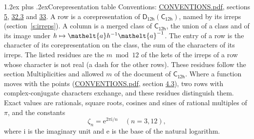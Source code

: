 \documentclass[10pt,a4paper]{article}
\makeatletter
\renewcommand\section{\@startsection{section}{1}{\z@}{-3ex plus -1ex minus -.2ex}%
  {1.2ex plus .2ex}{\normalfont\large\sffamily\bfseries\color{parttitle}}}
\numberwithin{equation}{section}
\newcommand{\eltfont}[1]{{\let\sigma\eltsigma\mathelt{#1}}}
\newcommand{\grp}[1]{\mathsf{#1}}
\newcommand{\elt}[1]{\eltfont{#1}}
\newcommand{\iunit}{\mathrm{i}}
\newcommand{\expe}{\mathrm{e}}
\newcommand{\rootunity}[1]{\zeta_{#1}}
\makeatother
\begin{document}
\section{Corepresentation table}\label{s:character_table}
Conventions: \href{../../CONVENTIONS.pdf}{CONVENTIONS.pdf}, sections \href{../../../rotation/CONVENTIONS.pdf\#conv.5}{5}, \href{../../CONVENTIONS.pdf\#conv.32.3}{32.3} and \href{../../CONVENTIONS.pdf\#conv.33}{33}.
A row is a corepresentation of $\grp{D_{12h}}(\grp{C_{12h}})$, named by its irreps (section~\ref{s:irreps}). A column is a merged class of $\grp{C_{12h}}$, the union of a class and of its image under $h \mapsto \elt{a} h^{-1} \elt{a}^{-1}$. The entry of a row is the character of its corepresentation on the class, the sum of the characters of its irreps.
\leavevmode\label{n:head.parity}The listed residues are the $m \bmod 12$ of the kets of the irreps of a row whose character is not real (a dash for the other rows). These residues follow the section Multiplicities and allowed $m$ of the document of \href{../../../rotation/data/pdf/C12h.pdf}{$\grp{C_{12h}}$}. Where a function moves with the points (\href{../../CONVENTIONS.pdf}{CONVENTIONS.pdf}, section \href{../../../rotation/CONVENTIONS.pdf\#conv.4.3}{4.3}), two rows with complex-conjugate characters exchange, and these residues distinguish them.
\leavevmode\label{n:constant.root}\label{n:index.root.order}Exact values are rationals, square roots, cosines and sines of rational multiples of $\pi$, and the constants
\begin{equation}\label{e:constants}\rootunity{n} = \expe^{2\pi\iunit/n}\quad(n = 3, 12),\end{equation}
where $\iunit$ is the imaginary unit and $\expe$ is the base of the natural logarithm.
\end{document}
